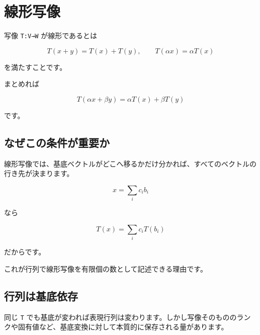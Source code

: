 \documentclass[
  11pt,
  a4paper,
]{ltjsarticle}
\author{}
\date{}
\begin{document}
\hypertarget{ux7ddaux5f62ux5199ux50cf}{%
\section{線形写像}\label{ux7ddaux5f62ux5199ux50cf}}

写像 \texttt{T:V→W} が線形であるとは

\[
T(x+y)=T(x)+T(y),\qquad T(\alpha x)=\alpha T(x)
\]

を満たすことです。

まとめれば

\[
T(\alpha x+\beta y)=\alpha T(x)+\beta T(y)
\]

です。

\hypertarget{ux306aux305cux3053ux306eux6761ux4ef6ux304cux91cdux8981ux304b}{%
\subsection{なぜこの条件が重要か}\label{ux306aux305cux3053ux306eux6761ux4ef6ux304cux91cdux8981ux304b}}

線形写像では、基底ベクトルがどこへ移るかだけ分かれば、すべてのベクトルの行き先が決まります。

\[
x=\sum_i c_i b_i
\]

なら

\[
T(x)=\sum_i c_iT(b_i)
\]

だからです。

これが行列で線形写像を有限個の数として記述できる理由です。

\hypertarget{ux884cux5217ux306fux57faux5e95ux4f9dux5b58}{%
\subsection{行列は基底依存}\label{ux884cux5217ux306fux57faux5e95ux4f9dux5b58}}

同じ \texttt{T}
でも基底が変われば表現行列は変わります。しかし写像そのもののランクや固有値など、基底変換に対して本質的に保存される量があります。
\end{document}
